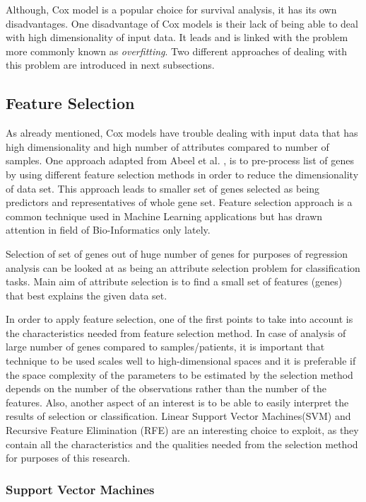 \documentclass{ba-kecs}
\numberwithin{figure}{section}
\numberwithin{equation}{section}
\begin{document}
Although, Cox model is a popular choice for survival analysis, it has its own disadvantages. One disadvantage of Cox models is their lack of being able to deal with high dimensionality of input data. It leads and is linked with the problem more commonly known as \textit{overfitting}. Two different approaches of dealing with this problem are introduced in next subsections.

\subsection{Feature Selection}
As already mentioned, Cox models have trouble dealing with input data that has high dimensionality and high number of attributes compared to number of samples. One approach adapted from Abeel et al. \cite{bootstrapping}, is to pre-process list of genes by using different feature selection methods in order to reduce the dimensionality of data set. This approach leads to smaller set of genes selected as being predictors and representatives of whole gene set. Feature selection approach is a common technique used in Machine Learning applications but has drawn attention in field of Bio-Informatics only lately.

Selection of set of genes out of huge number of genes for purposes of regression analysis can be looked at as being an attribute selection problem for classification tasks. Main aim of attribute selection is to find a small set of features (genes) that best explains the given data set.

In order to apply feature selection, one of the first points to take into account is the characteristics needed from feature selection method. In case of analysis of large number of genes compared to samples/patients, it is important that technique to be used scales well to high-dimensional spaces and it is preferable if the space complexity of the parameters to be estimated by the selection method depends on the number of the observations rather than the number of the features. Also, another aspect of an interest is to be able to easily interpret the results of selection or classification. Linear Support Vector Machines(SVM) and Recursive Feature Elimination (RFE) are an interesting choice to exploit, as they contain all the characteristics and the qualities needed from the selection method for purposes of this research.

\subsubsection{Support Vector Machines}
\end{document}
